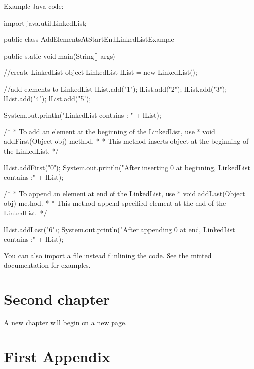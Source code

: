 \documentclass[a4paper,11pt,oneside]{book}
\begin{document}
Example Java code:

\begin{javacode}
import java.util.LinkedList;

public class AddElementsAtStartEndLinkedListExample {

  public static void main(String[] args) {

    //create LinkedList object
    LinkedList lList = new LinkedList();

    //add elements to LinkedList
    lList.add("1");
    lList.add("2");
    lList.add("3");
    lList.add("4");
    lList.add("5");

    System.out.println("LinkedList contains : " + lList);

    /*
     * To add an element at the beginning of the LinkedList, use
     * void addFirst(Object obj) method.
     *
     * This method inserts object at the beginning of the LinkedList.
     */

     lList.addFirst("0");
     System.out.println("After inserting 0 at beginning, LinkedList contains :"
     + lList);

    /*
     * To append an element at end of the LinkedList, use
     * void addLast(Object obj) method.
     *
     * This method append specified element at the end of the LinkedList.
     */

     lList.addLast("6");
     System.out.println("After appending 0 at end, LinkedList contains :" + lList);

  }
}
\end{javacode}

You can also import a file instead f inlining the code. See the minted documentation for examples.

\chapter{Second chapter}

A new chapter will begin on a new page.

\blindtext

\appendix
\chapter{First Appendix}

\blindtext

\backmatter

\end{document}
